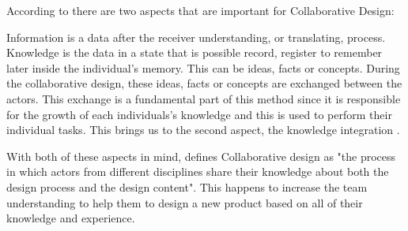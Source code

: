 

According to  there are two aspects that are important for Collaborative Design:

Information is a data after the receiver understanding, or translating, process. Knowledge is the data in a state that is possible record, register to remember later inside the individual's memory. This can be ideas, facts or concepts. During the collaborative design, these ideas, facts or concepts are exchanged between the actors. This exchange is a fundamental part of this method since it is responsible for the growth of each individuals's knowledge and this is used to perform their individual tasks. This brings us to the second aspect, the knowledge integration \cite{kleinsmann2006understanding}.

With both of these aspects in mind,  defines Collaborative design as "the process in which actors from different disciplines share their knowledge about both the design process and the design content". This happens to increase the team understanding to help them to design a new product based on all of their knowledge and experience.



